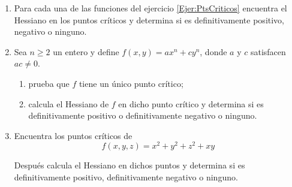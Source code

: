 \documentclass{article}
\theoremstyle{definition}
\begin{document}
\begin{enumerate}
  \item Para cada una de las funciones del ejercicio  \ref{Ejer:PtsCriticos}
    encuentra el Hessiano en los puntos cr\'iticos y determina si es
    definitivamente positivo, negativo o ninguno.

  \item Sea $n\geq 2$ un entero y define $f(x,y)=ax^n+cy^n$, donde
    $a$ y $c$ satisfacen $ac\ne 0$.
    \begin{enumerate}
    \item prueba que $f$ tiene un \'unico punto cr\'itico;
    \item calcula el Hessiano de $f$ en dicho punto cr\'itico
      y determina si es definitivamente positivo o definitivamente
      negativo o ninguno.
    \end{enumerate}

  \item Encuentra los puntos cr\'iticos de
    $$
    f(x,y,z)=x^2+y^2+z^2+xy
    $$

    Despu\'es calcula el Hessiano en dichos puntos y determina si es
    definitivamente positivo, definitivamente negativo o ninguno.

 
  \end{enumerate}
  

  
\end{document}
